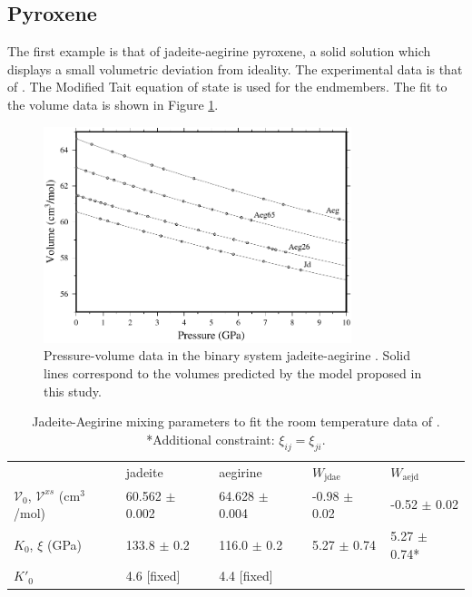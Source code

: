 \subsection{Pyroxene}
The first example is that of jadeite-aegirine pyroxene, a solid solution which displays a small volumetric deviation from ideality. The experimental data is that of \cite{NBLBT2006}. The Modified Tait equation of state \citep{HP2011} is used for the endmembers. The fit to the volume data is shown in Figure \ref{fig:PV_jadeite_aegirine}.

\begin{figure}[ht!]
  \centering
  \includegraphics[width=0.8\textwidth]{figures/jadeite_aegirine_P_V}
  \caption{Pressure-volume data in the binary system jadeite-aegirine \citep{NBLBT2006}. Solid lines correspond to the volumes predicted by the model proposed in this study.}
  \label{fig:PV_jadeite_aegirine}
\end{figure}

\begin{table}[ht!]
\centering
\caption{Jadeite-Aegirine mixing parameters to fit the room temperature data of \cite{NBLBT2006}. *Additional constraint: $\xi_{ij} = \xi_{ji}$.}
\label{tab:jd_aeg}
\begin{tabular}{lllll}
                                               & jadeite                        & aegirine                     & $W_{\textrm{jdae}}$                  & $W_{\textrm{aejd}}$             \\
$\mathcal{V}_0$, $\mathcal{V}^{xs}$ (cm$^3$/mol) & 60.562 $\pm$ 0.002 & 64.628 $\pm$ 0.004 & -0.98 $\pm$ 0.02    & -0.52 $\pm$ 0.02 \\
$K_0$, $\xi$ (GPa)                   & 133.8 $\pm$ 0.2       & 116.0 $\pm$ 0.2       & 5.27  $\pm$ 0.74    & 5.27 $\pm$ 0.74*      \\
$K'_0$             & 4.6 [fixed]                 & 4.4 [fixed]                 &              & 
\end{tabular}
\end{table}

